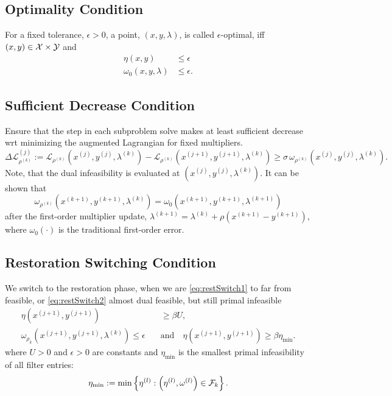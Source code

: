 \documentclass[11pt]{article}
\begin{document}
\subsection{Optimality Condition}

For a fixed tolerance, $\epsilon > 0$, a  point, $(x,y,\lambda)$, is called $\epsilon$-optimal, iff $(x,y) \in {\cal X} \times {\cal Y}$ and 
\begin{align}
  \eta(x,y) & \leq \epsilon \label{eq:etaOpt}\\[4pt]
  \omega_0(x,y,\lambda) & \leq \epsilon. \label{eq:omegaOpt}
\end{align}


\subsection{Sufficient Decrease Condition}

Ensure that the step in each subproblem solve makes at least sufficient decrease wrt minimizing the augmented Lagrangian for fixed multipliers.
\begin{equation}
  \Delta\mathcal{L}_{\rho^{(k)}}^{(j)}
  := \mathcal{L}_{\rho^{(k)}}(x^{(j)}, y^{(j)}, \lambda^{(k)})
   - \mathcal{L}_{\rho^{(k)}}(x^{(j+1)}, y^{(j+1)}, \lambda^{(k)})
  \geq \sigma\,\omega_{\rho^{(k)}}(x^{(j)}, y^{(j)}, \lambda^{(k)}).
  \label{eq:suffRed}
\end{equation}
Note, that the dual infeasibility is evaluated at $(x^{(j)}, y^{(j)}, \lambda^{(k)})$. It can be shown that
\[
\omega_{\rho^{(k)}}(x^{(k+1)}, y^{(k+1)}, \lambda^{(k)})
= \omega_{0}(x^{(k+1)}, y^{(k+1)}, \lambda^{(k+1)})
\]
after the first-order multiplier update, $\lambda^{(k+1)} = \lambda^{(k)} + \rho (x^{(k+1)} - y^{(k+1)})$, where $\omega_0(\cdot)$ is the traditional first-order error.

\subsection{Restoration Switching Condition}

We switch to the restoration phase, when we are \eqref{eq:restSwitch1} to far from feasible, or \eqref{eq:restSwitch2} almost dual feasible, but still primal infeasible
\begin{align}
  \eta(x^{(j+1)},y^{(j+1)}) &\geq \beta U, \label{eq:restSwitch1}\\[4pt]
  \omega_{\rho_k}(x^{(j+1)}, y^{(j+1)}, \lambda^{(k)}) \leq \epsilon \quad
  &\text{and} \quad \eta(x^{(j+1)},y^{(j+1)}) \geq \beta\eta_{\min}. \label{eq:restSwitch2}
\end{align}
where $U>0$ and $\epsilon>0$ are constants and $\eta_{\min}$ is the smallest primal infeasibility of all filter entries:
\begin{equation}\label{eq:DefEta}
  \eta_{\min} := \min \left\{ \eta^{(l)} : \left( \eta^{(l)}, \omega^{(l)} \right) \in {\cal F}_k \right\}.
\end{equation}
\end{document}

